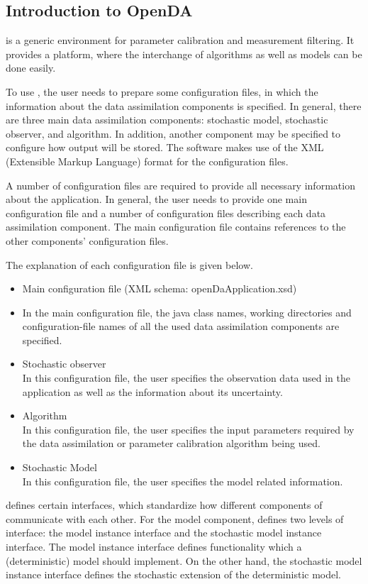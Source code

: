 \subsection{Introduction to OpenDA}
\oda is a generic environment for parameter calibration and measurement filtering. It provides a platform, where the interchange of algorithms as well as models can be done easily.

To use \oda, the user needs to prepare some configuration files, in which the information about the data assimilation components is specified. In general, there are three main data assimilation components: stochastic model, stochastic observer, and algorithm. In addition, another component may be specified to configure how \oda output will be stored. The \oda software makes use of the XML (Extensible Markup Language) format for the configuration files.

A number of configuration files are required to provide all necessary information about the \oda application. In general, the user needs to provide one main configuration file and a number of configuration files describing each data assimilation component. The main configuration file contains references to the other components’ configuration files.

The explanation of each configuration file is given below.

\begin{itemize}
    \item Main configuration file (XML schema: openDaApplication.xsd)
    \item In the main configuration file, the \oda java class names, working directories and configuration-file names of all the used data assimilation components are specified.
    \item Stochastic observer \\
		In this configuration file, the user specifies the observation data used in the application as well as the information about its uncertainty.
    \item Algorithm \\
		In this configuration file, the user specifies the input parameters required by the data assimilation or parameter calibration algorithm being used.
    \item Stochastic Model \\
		In this configuration file, the user specifies the model related information.
\end{itemize}

\oda defines certain interfaces, which standardize how different components of \oda communicate with each other. For the model component, \oda defines two levels of interface: the model instance interface and the stochastic model instance interface. The model instance interface defines functionality which a (deterministic) model should implement. On the other hand, the stochastic model instance interface defines the stochastic extension of the deterministic model.


